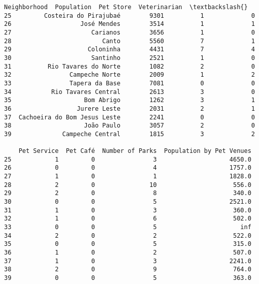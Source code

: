 \documentclass[11pt]{article}
\makeatletter
\newcommand{\boxspacing}{\kern\kvtcb@left@rule\kern\kvtcb@boxsep}
\newcommand{\prompt}[4]{
        \ttfamily\llap{{\color{#2}[#3]:\hspace{3pt}#4}}\vspace{-\baselineskip}
    }
\makeatother
\begin{document}
            \begin{tcolorbox}[breakable, size=fbox, boxrule=.5pt, pad at break*=1mm, opacityfill=0]
\prompt{Out}{outcolor}{41}{\boxspacing}
\begin{Verbatim}[commandchars=\\\{\}]
                    Neighborhood  Population  Pet Store  Veterinarian  \textbackslash{}
25         Costeira do Pirajubaé        9301          1             0
26                   José Mendes        3514          1             1
27                      Carianos        3656          1             0
28                         Canto        5560          7             1
29                     Coloninha        4431          7             4
30                      Santinho        2521          1             0
31          Rio Tavares do Norte        1082          2             0
32                Campeche Norte        2009          1             2
33                Tapera da Base        7081          0             0
34           Rio Tavares Central        2613          3             0
35                    Bom Abrigo        1262          3             1
36                  Jurere Leste        2031          2             1
37  Cachoeira do Bom Jesus Leste        2241          0             0
38                    João Paulo        3057          2             0
39              Campeche Central        1815          3             2

    Pet Service  Pet Café  Number of Parks  Population by Pet Venues
25            1         0                3                    4650.0
26            0         0                4                    1757.0
27            1         0                1                    1828.0
28            2         0               10                     556.0
29            2         0                8                     340.0
30            0         0                5                    2521.0
31            1         0                3                     360.0
32            1         0                6                     502.0
33            0         0                5                       inf
34            2         0                2                     522.0
35            0         0                5                     315.0
36            1         0                2                     507.0
37            1         0                3                    2241.0
38            2         0                9                     764.0
39            0         0                5                     363.0
\end{Verbatim}
\end{tcolorbox}
        
\end{document}
